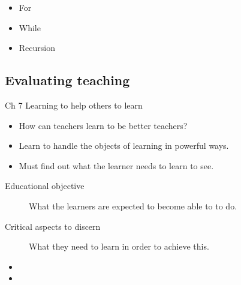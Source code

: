 \begin{frame}
  \begin{solution}[Repetitions]
    \begin{itemize}
      \item For
      \item While
      \item Recursion
    \end{itemize}
  \end{solution}
\end{frame}


\subsection{Evaluating teaching}

\begin{frame}
  \begin{block}{Ch 7 Learning to help others to learn}
    \begin{itemize}
      \item How can teachers learn to be better teachers?
      \item Learn to handle the objects of learning in powerful ways.
      \item Must find out what the learner needs to learn to see.
    \end{itemize}
  \end{block}

  \pause

  \begin{remark}
    \begin{description}
      \item[Educational objective]
        What the learners are expected to become able to to do.

      \item[Critical aspects to discern]
        What they need to learn in order to achieve this.
    \end{description}
  \end{remark}
\end{frame}

\begin{frame}
  \begin{remark}
    \begin{itemize}
      \item<+> 
      \item<+> 
    \end{itemize}
  \end{remark}
\end{frame}


